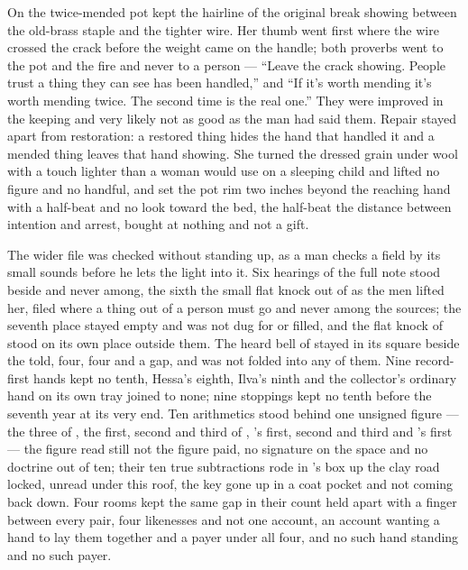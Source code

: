 On  the twice-mended pot kept the hairline of the original break showing between the old-brass staple and the tighter wire. Her thumb went first where the wire crossed the crack before the weight came on the handle; both proverbs went to the pot and the fire and never to a person — “Leave the crack showing. People trust a thing they can see has been handled,” and “If it's worth mending it's worth mending twice. The second time is the real one.” They were improved in the keeping and very likely not as good as the man had said them. Repair stayed apart from restoration: a restored thing hides the hand that handled it and a mended thing leaves that hand showing. She turned the dressed grain under wool with a touch lighter than a woman would use on a sleeping child and lifted no figure and no handful, and set the pot rim two inches beyond the reaching hand with a half-beat and no look toward the bed, the half-beat the distance between intention and arrest, bought at nothing and not a gift.

The wider file was checked without standing up, as a man checks a field by its small sounds before he lets the light into it. Six hearings of the full note stood beside and never among, the sixth the small flat knock out of  as the men lifted her, filed where a thing out of a person must go and never among the sources; the seventh place stayed empty and was not dug for or filled, and the flat knock of  stood on its own place outside them. The heard bell of  stayed in its square beside the told, four, four and a gap, and was not folded into any of them. Nine record-first hands kept no tenth, Hessa's eighth, Ilva's ninth and the collector's ordinary hand on its own tray joined to none; nine stoppings kept no tenth before the seventh year at its very end. Ten arithmetics stood behind one unsigned figure — the three of , the first, second and third of , 's first, second and third and 's first — the figure read still not the figure paid, no signature on the space and no doctrine out of ten; their ten true subtractions rode in 's box up the clay road locked, unread under this roof, the key gone up in a coat pocket and not coming back down. Four rooms kept the same gap in their count held apart with a finger between every pair, four likenesses and not one account, an account wanting a hand to lay them together and a payer under all four, and no such hand standing and no such payer.


